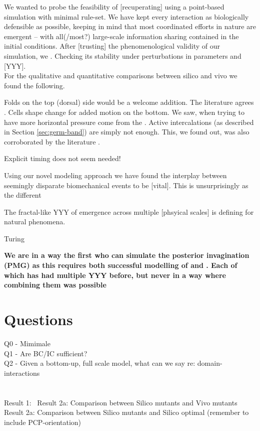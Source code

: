 We wanted to probe the feasibility of [recuperating] using a point-based simulation with minimal rule-set. We have kept every interaction as biologically defensible as possible, keeping in mind that most coordinated efforts in nature are emergent -- with all(/most?) large-scale information sharing contained in the initial conditions.
After [trusting] the phenomenological validity of our simulation, we . Checking its stability under perturbations in parameters and [YYY].\\

For the qualitative and quantitative comparisons between silico and vivo we found the following.

Folds on the top (dorsal) side would be a welcome addition. The literature agrees \reph{}. Cells shape change for added motion on the bottom. We saw, when trying to have more horizontal pressure come from the . Active intercalations (as described in Section \ref{sec:germ-band}) are simply not enough. This, we found out, was also corroborated by the literature \cite{detder}.

Explicit timing does not seem needed!

Using our novel modeling approach we have found the interplay between seemingly disparate biomechanical events to be [vital]. This is   unsurprisingly as the different   

The fractal-like YYY of emergence across multiple [phsyical scales] is defining for natural phenomena.

Turing


\textbf{We are in a way the first who can simulate the posterior invagination (PMG)  as this requires both successful modelling of  and . Each of which has had multiple YYY before, but never in a way where combining them was possible}


\section{Questions}
Q0 - Mimimale\\
Q1 - Are BC/IC sufficient?\\
Q2 - Given a bottom-up, full scale model, what can we say re: domain-interactions\\
\\\\
Result 1: \
Result 2a: Comparison between Silico mutants and Vivo mutants\\
Result 2a: Comparison between Silico mutants and Silico optimal (remember to include PCP-orientation)\\

